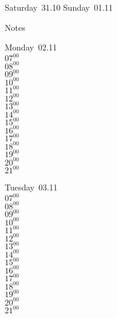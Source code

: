 \documentclass[11pt,a4paper]{book}\usepackage[]{graphicx}\usepackage[]{color}
\begin{document}
\begin{weekendbox}
  Saturday~31.10
  \tcblower
  Sunday~01.11
\end{weekendbox} %
\begin{notebox}
  Notes
\end{notebox}
\clearpage
\begin{headerbox}
\end{headerbox}
\begin{weekdaybox}
  Monday~02.11\\
  { 
  \vfill
  $07^{00}$\\
$08^{00}$\\
$09^{00}$\\
$10^{00}$\\
$11^{00}$\\
$12^{00}$\\
$13^{00}$\\
$14^{00}$\\
$15^{00}$\\
$16^{00}$\\
$17^{00}$\\
$18^{00}$\\
$19^{00}$\\
$20^{00}$\\
$21^{00}$\\
  }
\end{weekdaybox}
\begin{weekdaybox}
  Tuesday~03.11\\
  { 
  \vfill
  $07^{00}$\\
$08^{00}$\\
$09^{00}$\\
$10^{00}$\\
$11^{00}$\\
$12^{00}$\\
$13^{00}$\\
$14^{00}$\\
$15^{00}$\\
$16^{00}$\\
$17^{00}$\\
$18^{00}$\\
$19^{00}$\\
$20^{00}$\\
$21^{00}$\\
  }
\end{weekdaybox}
\end{document}
